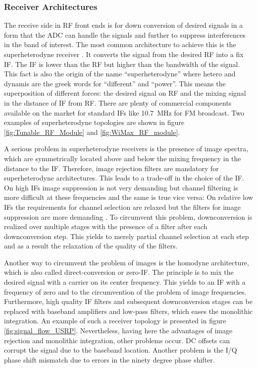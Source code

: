 \subsubsection{Receiver Architectures}
The receive side in RF front ends is for down conversion of desired signals in a form that the \ac{ADC} can handle the signals and further to suppress interferences in the band of interest. The most common architecture to achieve this is the superheterodyne receiver \cite{jon_SDR}. It converts the signal from the desired \ac{RF} into a fix \ac{IF}. The \ac{IF} is lower than the \ac{RF} but higher than the bandwidth of the signal. This fact is also the origin of the name ``superheterodyne'' where hetero and dynamis are the greek words for ``different'' and ``power''. This means the superposition of different forces: the desired signal on \ac{RF} and the mixing signal in the distance of \ac{IF} from \ac{RF}. There are plenty of commercial components available on the market for standard \acp{IF} like \SI{10.7}{MHz} for FM broadcast. Two examples of superheterodyne topologies are shown in figure \ref{fig:Tunable_RF_Module} and \ref{fig:WiMax_RF_module}.

A serious problem in superheterodyne receivers is the presence of image spectra, which are symmetrically located above and below the mixing frequency in the distance to the \ac{IF}. Therefore, image rejection filters are mandatory for superheterodyne architectures. This leads to a trade-off in the choice of the \ac{IF}. On high \acp{IF} image suppression is not very demanding but channel filtering is more difficult at these frequencies and the same is true vice versa: On relative low \acp{IF} the requirements for channel selection are relaxed but the filters for image suppression are more demanding \cite{razavi_RF}. To circumvent this problem, downconversion is realized over multiple stages with the presence of a filter after each downconversion step. This yields to merely partial channel selection at each step and as a result the relaxation of the quality of the filters.

Another way to circumvent the problem of images is the homodyne architecture, which is also called direct-conversion or zero-IF. The principle is to mix the desired signal with a carrier on its center frequency. This yields to an \ac{IF} with a frequency of zero and to the circumvention of the problem of image frequencies. Furthermore, high quality IF filters and subsequent downconversion stages can be replaced with baseband amplifiers and low-pass filters, which eases the monolithic integration. An example of such a receiver topology is presented in figure \ref{fig:signal_flow_USRP}. Nevertheless, having here the advantages of image rejection and monolithic integration, other problems occur. DC offsets can corrupt the signal due to the baseband location. Another problem is the I/Q phase shift mismatch due to errors in the ninety degree phase shifter.

